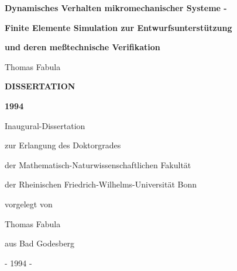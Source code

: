 
\vspace*{3cm}


\centerline{\Large{{\bf Dynamisches Verhalten mikromechanischer Systeme - }} }
\centerline{\Large{{\bf Finite Elemente Simulation zur Entwurfsunterstützung}} }
\centerline{\Large{{\bf und deren meßtechnische Verifikation}} }

\vspace*{1.5cm}

\centerline{Thomas Fabula}


\vspace*{1.4cm}


\centerline{\large{{\bf DISSERTATION}}}

\vspace*{0.3cm}

\centerline{\large{{\bf 1994}}}

\vspace*{4cm}



\centerline{Inaugural-Dissertation}
\centerline{zur Erlangung des Doktorgrades}
\centerline{der Mathematisch-Naturwissenschaftlichen Fakultät}
\centerline{der Rheinischen Friedrich-Wilhelms-Universität Bonn}

\vspace*{2.3cm}

\centerline{vorgelegt von}
\centerline{Thomas Fabula}
\centerline{aus Bad Godesberg}
\centerline{- 1994 -}

